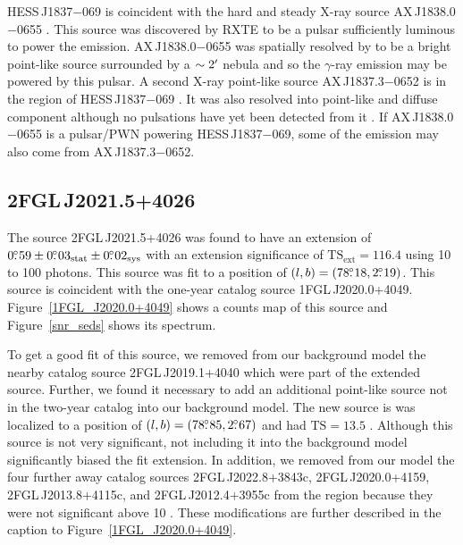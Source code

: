 \documentclass[12pt,preprint]{aastex}
\newcommand{\gev}{\text{GeV}\xspace}
\newcommand{\tev}{\text{TeV}\xspace}
\newcommand{\tsext}{{\ensuremath{\text{TS}_{\text{ext}}}}\xspace}
\newcommand{\chandra}{\text{{\em Chandra}}\xspace}
\newcommand{\ts}{\text{TS}\xspace}
\newcommand{\sys}{\text{sys}\xspace}
\newcommand{\stat}{\text{stat}\xspace}
\newcommand{\hl}[1]{#1}
\begin{document}
\hl{
HESS\,J1837$-$069 is coincident
with the hard and steady X-ray source AX\,J1838.0$-$0655
\citep{einstein_galactic_plane_survey,hard_x-ray_asca,integral_AX_J1838.0-0655,swift_follow_up,pulsations_HESS_J1837-069,suzaku_HESS_J1837-069}.
This source was discovered by RXTE to be a pulsar sufficiently
luminous to power the \tev emission.  AX\,J1838.0$-$0655 was spatially
resolved by \chandra to be a bright point-like source surrounded by
a $\sim2\mbox{$^\prime$}$ nebula \citep{pulsations_HESS_J1837-069} and so the
$\gamma$-ray emission may be powered by this pulsar.  A second
X-ray point-like source AX\,J1837.3$-$0652 is in the region of HESS\,J1837$-$069
\citep{hard_x-ray_asca,swift_follow_up,pulsations_HESS_J1837-069,suzaku_HESS_J1837-069}.
It was also resolved into point-like and diffuse component
although no pulsations have yet been detected from it
\citep{pulsations_HESS_J1837-069}.  If AX\,J1838.0$-$0655 is a pulsar/PWN
powering HESS\,J1837$-$069, some of the \tev emission may also come from
AX\,J1837.3$-$0652.
}


\subsection{2FGL\,J2021.5+4026}
\label{section_2FGL J2021.5+4026}



The source 2FGL\,J2021.5+4026 was found to have an extension of
$0\fdg59\pm0\fdg03_\stat\pm0\fdg02_\sys$ with an extension significance
of $\tsext=116.4$ using 10 \gev to 100 \gev photons.  This source
was fit to a position of $(l,b)=(78\mbox{$.\!\!^\circ$}18,2\mbox{$.\!\!^\circ$}19)$.  This source is
coincident with the one-year catalog source 1FGL\,J2020.0+4049. \hl{
Figure~\ref{1FGL_J2020.0+4049} shows a counts map of this source
and Figure~\ref{snr_seds} shows its spectrum.  
}

To get a good fit of this source, we removed from our background
model the nearby catalog
source 2FGL\,J2019.1+4040 which were part of the extended source.
Further, we found it necessary to add an additional point-like source not in
the two-year catalog into our background model.  The new source is was
localized to a position of $(l,b)=(78\mbox{$.\!\!^\circ$}85,2\mbox{$.\!\!^\circ$}67)$ and had $\ts=13.5$ .
Although this source is not very significant, not including it into the
background model significantly biased the fit extension.
In addition, we removed from our model the four further away catalog
sources 2FGL\,J2022.8+3843c, 2FGL\,J2020.0+4159, 2FGL\,J2013.8+4115c,
and 2FGL\,J2012.4+3955c from the region because they were not significant
above 10 \gev.  These modifications are further described in the caption to
Figure~\ref{1FGL_J2020.0+4049}.
\end{document}
